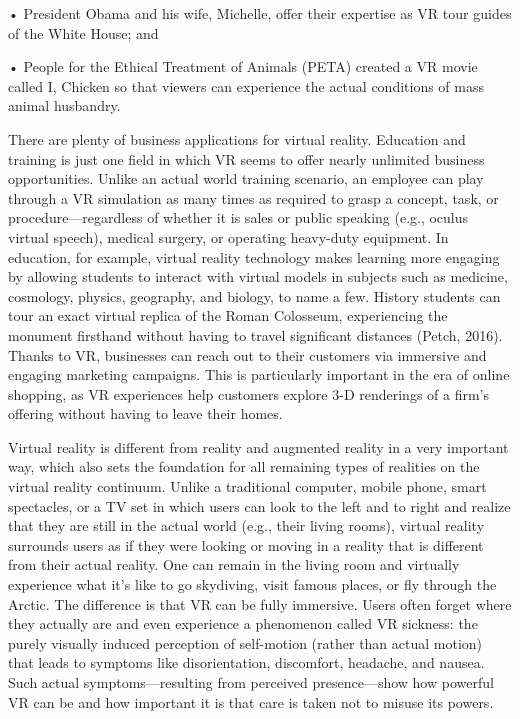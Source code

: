 •
President Obama and his wife, Michelle, offer their expertise as VR tour guides of the White House; and

•
People for the Ethical Treatment of Animals (PETA) created a VR movie called I, Chicken so that viewers can experience the actual conditions of mass animal husbandry.


There are plenty of business applications for virtual reality. Education and training is just one field in which VR seems to offer nearly unlimited business opportunities. Unlike an actual world training scenario, an employee can play through a VR simulation as many times as required to grasp a concept, task, or procedure—regardless of whether it is sales or public speaking (e.g., oculus virtual speech), medical surgery, or operating heavy-duty equipment. In education, for example, virtual reality technology makes learning more engaging by allowing students to interact with virtual models in subjects such as medicine, cosmology, physics, geography, and biology, to name a few. History students can tour an exact virtual replica of the Roman Colosseum, experiencing the monument firsthand without having to travel significant distances (Petch, 2016). Thanks to VR, businesses can reach out to their customers via immersive and engaging marketing campaigns. This is particularly important in the era of online shopping, as VR experiences help customers explore 3-D renderings of a firm’s offering without having to leave their homes.


Virtual reality is different from reality and augmented reality in a very important way, which also sets the foundation for all remaining types of realities on the virtual reality continuum. Unlike a traditional computer, mobile phone, smart spectacles, or a TV set in which users can look to the left and to right and realize that they are still in the actual world (e.g., their living rooms), virtual reality surrounds users as if they were looking or moving in a reality that is different from their actual reality. One can remain in the living room and virtually experience what it’s like to go skydiving, visit famous places, or fly through the Arctic. The difference is that VR can be fully immersive. Users often forget where they actually are and even experience a phenomenon called VR sickness: the purely visually induced perception of self-motion (rather than actual motion) that leads to symptoms like disorientation, discomfort, headache, and nausea. Such actual symptoms—resulting from perceived presence—show how powerful VR can be and how important it is that care is taken not to misuse its powers.



